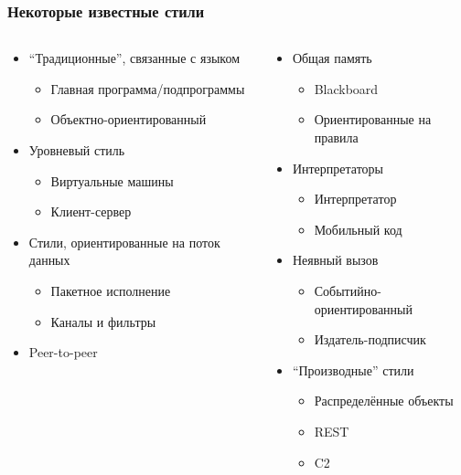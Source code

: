 \documentclass[xetex,mathserif,serif]{beamer}
\begin{document}
	\begin{frame}
		\frametitle{Некоторые известные стили}
		\begin{columns}
			\begin{column}{0.5\textwidth}
				\begin{itemize}
					\item ``Традиционные'', связанные с языком
					\begin{itemize}
						\item Главная программа/подпрограммы
						\item Объектно-ориентированный
					\end{itemize}
					\item Уровневый стиль
					\begin{itemize}
						\item Виртуальные машины
						\item Клиент-сервер
					\end{itemize}
					\item Стили, ориентированные на поток данных
					\begin{itemize}
						\item Пакетное исполнение
						\item Каналы и фильтры
					\end{itemize}
					\item Peer-to-peer
				\end{itemize}
			\end{column}
			\begin{column}{0.5\textwidth}
				\begin{itemize}
					\item Общая память
					\begin{itemize}
						\item Blackboard
						\item Ориентированные на правила
					\end{itemize}
					\item Интерпретаторы
					\begin{itemize}
						\item Интерпретатор
						\item Мобильный код
					\end{itemize}
					\item Неявный вызов
					\begin{itemize}
						\item Событийно-ориентированный
						\item Издатель-подписчик
					\end{itemize}
					\item ``Производные'' стили
					\begin{itemize}
						\item Распределённые объекты
						\item REST
						\item C2
					\end{itemize}
				\end{itemize}
			\end{column}
		\end{columns}
	\end{frame}
\end{document}
